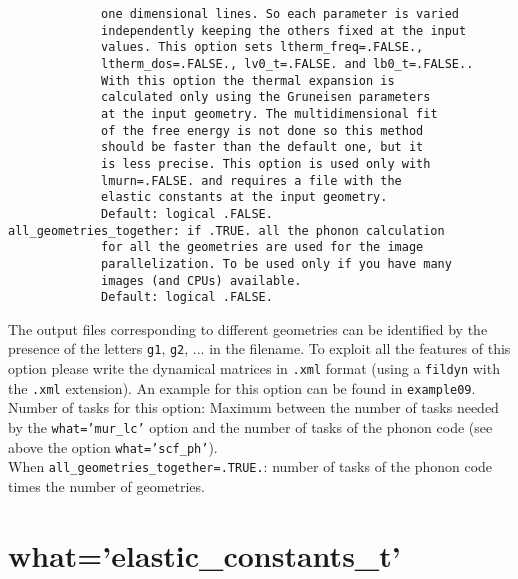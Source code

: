 \documentclass[12pt,a4paper,twoside]{report}
\begin{document}
\begin{verbatim}
             one dimensional lines. So each parameter is varied 
             independently keeping the others fixed at the input 
             values. This option sets ltherm_freq=.FALSE., 
             ltherm_dos=.FALSE., lv0_t=.FALSE. and lb0_t=.FALSE..
             With this option the thermal expansion is 
             calculated only using the Gruneisen parameters 
             at the input geometry. The multidimensional fit 
             of the free energy is not done so this method 
             should be faster than the default one, but it
             is less precise. This option is used only with 
             lmurn=.FALSE. and requires a file with the 
             elastic constants at the input geometry.
             Default: logical .FALSE.
all_geometries_together: if .TRUE. all the phonon calculation 
             for all the geometries are used for the image 
             parallelization. To be used only if you have many 
             images (and CPUs) available.
             Default: logical .FALSE.
\end{verbatim}

The output files corresponding to different geometries can be identified
by the presence of the letters \texttt{g1}, \texttt{g2}, ... in the filename.
To exploit all the features of this option please write the dynamical matrices
in \texttt{.xml} format (using a \texttt{fildyn} with the \texttt{.xml}
extension).
An example for this option can be found in \texttt{example09}. \\
Number of tasks for this option: Maximum between the number of tasks  
needed by the \texttt{what='mur\_lc'} option and the number
of tasks of the phonon code (see above the option \texttt{what='scf\_ph'}). \\
When \texttt{all\_geometries\_together=.TRUE.}: number of tasks of the
phonon code times the number of geometries. \\

\newpage
{\color{coral}\section{what='elastic\_constants\_t'}}
\color{black}
\end{document}

